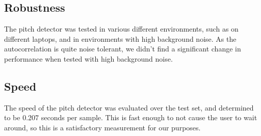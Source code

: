 \subsection{Robustness}
The pitch detector was tested in various different environments, such as on different laptops, and in environments with high background noise. As the autocorrelation is quite noise tolerant, we didn't find a significant change in performance when tested with high background noise.

\subsection{Speed}
The speed of the pitch detector was evaluated over the test set, and determined to be 0.207 seconds per sample. This is fast enough to not cause the user to wait around, so this is a satisfactory measurement for our purposes.